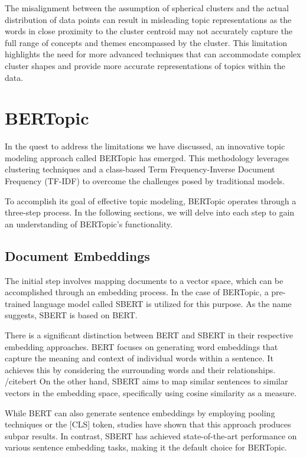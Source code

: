 \documentclass[a4paper,10pt]{report} %
\begin{document}
The misalignment between the assumption of spherical clusters and the actual distribution of data points can result in misleading topic representations as the words in close proximity to the cluster centroid may not accurately capture the full range of concepts and themes encompassed by the cluster. This limitation highlights the need for more advanced techniques that can accommodate complex cluster shapes and provide more accurate representations of topics within the data. \cite{bertopic}

\section{BERTopic}
In the quest to address the limitations we have discussed, an innovative topic modeling approach called BERTopic \cite{bertopic} has emerged. This methodology leverages clustering techniques and a class-based Term Frequency-Inverse Document Frequency (TF-IDF) to overcome the challenges posed by traditional models.

To accomplish its goal of effective topic modeling, BERTopic operates through a three-step process. In the following sections, we will delve into each step to gain an understanding of BERTopic's functionality.

\subsection{Document Embeddings}
The initial step involves mapping documents to a vector space, which can be accomplished through an embedding process. In the case of BERTopic, a pre-trained language model called SBERT is utilized for this purpose. As the name suggests, SBERT is based on BERT.

There is a significant distinction between BERT and SBERT in their respective embedding approaches. BERT focuses on generating word embeddings that capture the meaning and context of individual words within a sentence. It achieves this by considering the surrounding words and their relationships. /cite{bert} On the other hand, SBERT aims to map similar sentences to similar vectors in the embedding space, specifically using cosine similarity as a measure. \cite{sbert}

While BERT can also generate sentence embeddings by employing pooling techniques or the [CLS] token, studies \cite{sbert} have shown that this approach produces subpar results. In contrast, SBERT \cite{sbert} has achieved state-of-the-art performance on various sentence embedding tasks, making it the default choice for BERTopic.
\end{document}
